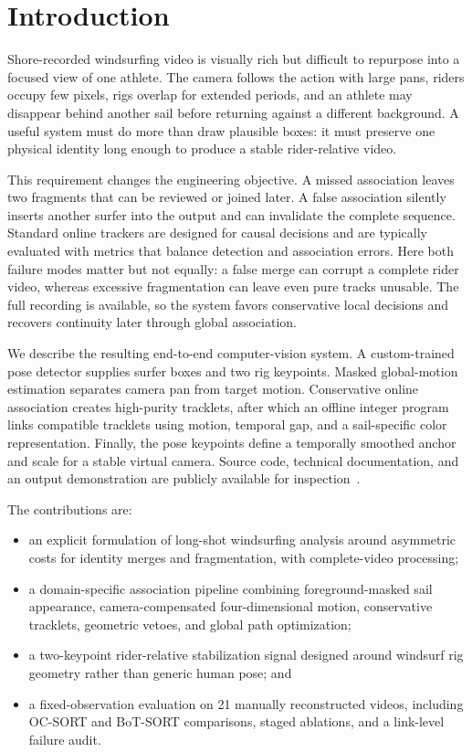 \section{Introduction}

Shore-recorded windsurfing video is visually rich but difficult to repurpose into a
focused view of one athlete.  The camera follows the action with large pans, riders
occupy few pixels, rigs overlap for extended periods, and an athlete may disappear
behind another sail before returning against a different background.  A useful system
must do more than draw plausible boxes: it must preserve one physical identity long
enough to produce a stable rider-relative video.

This requirement changes the engineering objective.  A missed association leaves two
fragments that can be reviewed or joined later.  A false association silently inserts
another surfer into the output and can invalidate the complete sequence.  Standard
online trackers are designed for causal decisions and are typically evaluated with
metrics that balance detection and association errors.  Here both failure modes
matter but not equally: a false merge can corrupt a complete rider video, whereas
excessive fragmentation can leave even pure tracks unusable.  The full recording is
available, so the system favors conservative local decisions and recovers continuity
later through global association.

We describe the resulting end-to-end computer-vision system.  A custom-trained
pose detector supplies surfer boxes and two rig keypoints.  Masked global-motion estimation
separates camera pan from target motion.  Conservative online association creates
high-purity tracklets, after which an offline integer program links compatible
tracklets using motion, temporal gap, and a sail-specific color representation.
Finally, the pose keypoints define a temporally smoothed anchor and scale for a stable
virtual camera.  Source code, technical documentation, and an output demonstration
are publicly available for inspection~\cite{projectresources}.

The contributions are:
\begin{itemize}
  \item an explicit formulation of long-shot windsurfing analysis around asymmetric
  costs for identity merges and fragmentation, with complete-video processing;
  \item a domain-specific association pipeline combining foreground-masked sail
  appearance, camera-compensated four-dimensional motion, conservative tracklets,
  geometric vetoes, and global path optimization;
  \item a two-keypoint rider-relative stabilization signal designed around windsurf
  rig geometry rather than generic human pose; and
  \item a fixed-observation evaluation on 21 manually reconstructed videos, including
  OC-SORT and BoT-SORT comparisons, staged ablations, and a link-level failure audit.
\end{itemize}
